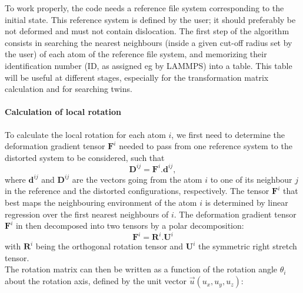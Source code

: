 \documentclass[final,3p,times,twocolumn]{elsarticle}
\begin{document}
To work properly, the code needs a reference file system corresponding to the initial state. This reference system is defined by the user; it should preferably be not deformed and must not contain dislocation. The first step of the algorithm consists in searching the nearest neighbours (inside a given cut-off radius set by the user) of each atom of the reference file system, and memorizing their identification number (ID, as assigned eg by LAMMPS) into a table. This table will be useful at different stages, especially for the transformation matrix calculation and for searching twins.
 
\paragraph{Calculation of local rotation}
To calculate the local rotation for each atom $i$, we first need to determine the deformation gradient tensor $ \mathbf{F}^{i} $ needed to pass from one reference system to the distorted system to be considered, such that
\begin{equation}
\mathbf{D}^{ij}=\mathbf{F}^{i}.\mathbf{d}^{ij},
\end{equation}
where $\mathbf{d}^{ij}$ and $\mathbf{D}^{ij}$ are  the vectors  going from the atom $i$ to one of its neighbour  $j$ in the reference and the distorted configurations, respectively. The  tensor $ \mathbf{F}^{i} $ that best maps the neighbouring environment of the atom $i$ is determined  by linear regression over the first nearest neighbours of $i$.
The deformation gradient tensor $ \mathbf{F}^{i} $ in then decomposed into two tensors by a polar decomposition:
\begin{equation}
\mathbf{F}^{i}=\mathbf{R}^{i}.\mathbf{U}^{i}
\end{equation}
with $ \mathbf{R}^{i} $ being the orthogonal rotation tensor and $ \mathbf{U}^{i} $ the symmetric right stretch tensor. \\ 
The rotation matrix can then be written as a function of the rotation angle $ \theta_{i} $ about the rotation axis, defined by the unit vector $ \overrightarrow{u} (u_{x},u_{y},u_{z})$:
\end{document}
